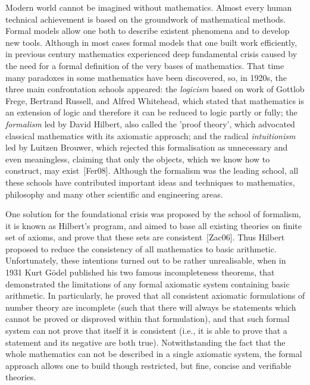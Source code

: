 \documentclass[article]{aaltoseries}
\begin{document}
Modern world cannot be imagined without mathematics. Almost every human technical achievement is based on the groundwork of mathematical methods. Formal models allow one both to describe existent phenomena and to develop new tools.
Although in most cases formal models that one built work efficiently, in previous century mathematics experienced deep fundamental crisis caused by the need for a formal definition of the very bases of mathematics. That time many paradoxes in some mathematics have been discovered, so, in 1920s, the three main confrontation schools appeared:
the \textit{logicism} based on work of Gottlob Frege, Bertrand Russell, and Alfred Whitehead, which stated that mathematics is an extension of logic and therefore it can be reduced to logic partly or fully;
the \textit{formalism} led by David Hilbert, also called the 'proof theory', which advocated classical mathematics with its axiomatic approach;
and the radical \textit{intuitionism} led by Luitzen Brouwer, which rejected this formalisation as unnecessary and even meaningless, claiming that only the objects, which we know how to construct, may exist~[Fer08].
Although the formalism was the leading school, all these schools have contributed important ideas and techniques to mathematics, philosophy and many other scientific and engineering areas.

One solution for the foundational crisis was proposed by the school of formalism, it is known as Hilbert's program, and aimed to base all existing theories on finite set of axioms, and prove that these sets are consistent~[Zac06]. Thus Hilbert proposed to reduce the consistency of all mathematics to basic arithmetic. 
Unfortunately, these intentions turned out to be rather unrealisable, when in 1931 Kurt Gödel published his two famous incompleteness theorems, that demonstrated the limitations of any formal axiomatic system containing basic arithmetic. In particularly, he proved that all consistent axiomatic formulations of number theory are incomplete (such that there will always be statements which cannot be proved or disproved within that formulation), and that such formal system can not prove that itself it is consistent (i.e., it is able to prove that a statement and its negative are both true).
Notwithstanding the fact that the whole mathematics can not be described in a single axiomatic system, the formal approach allows one to build though restricted, but fine, concise and verifiable theories.

\end{document}
